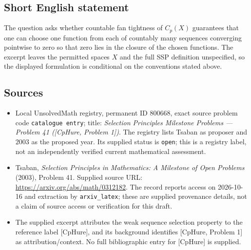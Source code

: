 \documentclass[11pt]{article}
\begin{document}
\subsection{Short English statement}
The question asks whether countable fan tightness of \(C_p(X)\) guarantees that one can choose one function from each of countably many sequences converging pointwise to zero so that zero lies in the closure of the chosen functions. The excerpt leaves the permitted spaces \(X\) and the full SSP definition unspecified, so the displayed formulation is conditional on the conventions stated above.
\subsection{Sources}
\begin{itemize}
\item Local UnsolvedMath registry, permanent ID \(800668\), exact source problem code \texttt{catalogue entry}; title: \emph{Selection Principles Milestone Problems --- Problem 41 ([CpHure, Problem 1])}. The registry lists Tsaban as proposer and \(2003\) as the proposed year. Its supplied status is \texttt{open}; this is a registry label, not an independently verified current mathematical assessment.
\item Tsaban, \emph{Selection Principles in Mathematics: A Milestone of Open Problems} (2003), Problem 41. Supplied source URL: \url{https://arxiv.org/abs/math/0312182}. The record reports access on 2026-10-16 and extraction by \texttt{arxiv\_latex}; these are supplied provenance details, not a claim of source access or verification for this draft.
\item The supplied excerpt attributes the weak sequence selection property to the reference label [CpHure], and its background identifies [CpHure, Problem 1] as attribution/context. No full bibliographic entry for [CpHure] is supplied.
\end{itemize}
\end{document}
